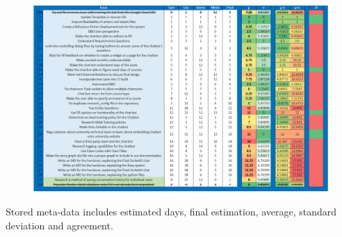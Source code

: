\documentclass{l3proj}
\begin{document}
\begin{figure}[h!]
    \centering
    \includegraphics[width=0.85\linewidth]{figures/ppiteration6.PNG}
\end{figure}

Stored meta-data includes estimated days, final estimation, average, standard deviation and agreement.
\end{document}
